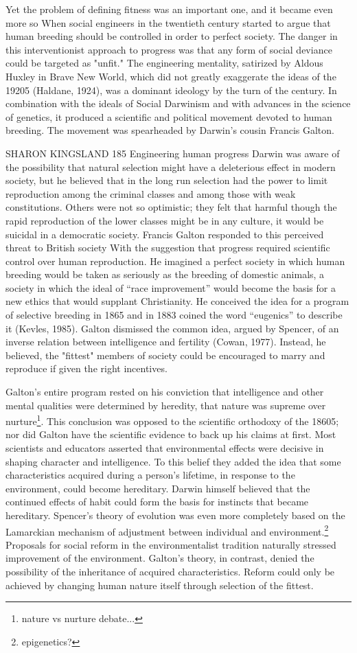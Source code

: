 \documentclass[12pt]{letter}
\begin{document}
Yet the problem of defining fitness was an important one, and it became even more so When social engineers in the twentieth century started to argue that human breeding should be controlled in order to perfect society. The danger in this interventionist approach to progress was that any form of social deviance could be targeted as "unfit." The engineering mentality, satirized by Aldous Huxley in Brave New World, which did not greatly exaggerate the ideas of the 19205 (Haldane, 1924), was a dominant ideology by the turn of the century. In combination with the ideals of Social Darwinism and with advances in the science of genetics, it produced a scientific and political movement devoted to human breeding. The movement was spearheaded by Darwin's cousin Francis Galton.


SHARON KINGSLAND 185
Engineering human progress
Darwin was aware of the possibility that natural selection might have a deleterious effect in modern society, but he believed that in the long run selection had the power to limit reproduction among the criminal classes and among those with weak constitutions. Others were not so optimistic; they felt that harmful though the rapid reproduction of the lower classes might be in any culture, it would be suicidal in a democratic society. Francis Galton responded to this perceived threat to British society With the suggestion that progress required scientific control over human reproduction. He imagined a perfect society in which human breeding would be taken as seriously as the breeding of domestic animals, a society in which the ideal of “race improvement” would become the basis for a new ethics that would supplant Christianity. He conceived the idea for a program of selective breeding in 1865 and in 1883 coined the word “eugenics” to describe it (Kevles, 1985). Galton dismissed the common idea, argued by Spencer, of an inverse relation between intelligence and fertility (Cowan, 1977). Instead, he believed, the "fittest" members of society could be encouraged to marry and reproduce if given the right incentives.

Galton’s entire program rested on his conviction that intelligence and other mental qualities were determined by heredity, that nature was supreme over nurture\footnote{nature vs nurture debate...}. This conclusion was opposed to the scientific orthodoxy of the 18605; nor did Galton have the scientific evidence to back up his claims at first. Most scientists and educators asserted that environmental effects were decisive in shaping character and intelligence. To this belief they added the idea that some characteristics acquired during a person’s lifetime, in response to the environment, could become hereditary. Darwin himself believed that the continued effects of habit could form the basis for instincts that became hereditary. Spencer’s theory of evolution was even more completely based on the Lamarckian mechanism of adjustment between individual and environment.\footnote{epigenetics?} Proposals for social reform in the environmentalist tradition naturally stressed improvement of the environment. Galton’s theory, in contrast, denied the possibility of the inheritance of acquired characteristics. Reform could only be achieved by changing human nature itself through selection of the fittest.
\end{document}
